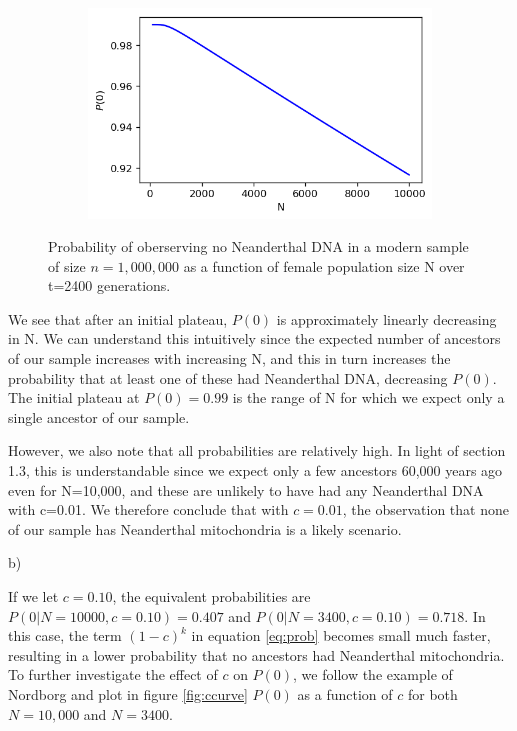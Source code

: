 \documentclass{article}
\begin{document}
\begin{figure}[h]
	\centering
	\begin{subfigure}[t]{0.45\linewidth}
		\centering
		\includegraphics[width = 1.0\linewidth, trim={0 0 0 0}, clip=true]{figures/popN_curve.png}
	\end{subfigure}
\caption{Probability of oberserving no Neanderthal DNA in a modern sample of size $n=1,000,000$ as a function of female population size N over t=2400 generations.}
\label{fig:Ncurve}
\end{figure}

We see that after an initial plateau, $P(0)$ is approximately linearly decreasing in N. We can understand this intuitively since the expected number of ancestors of our sample increases with increasing N, and this in turn increases the probability that at least one of these had Neanderthal DNA, decreasing $P(0)$. The initial plateau at $P(0) = 0.99$ is the range of N for which we expect only a single ancestor of our sample.

However, we also note that all probabilities are relatively high. In light of section 1.3, this is understandable since we expect only a few ancestors 60,000 years ago even for N=10,000, and these are unlikely to have had any Neanderthal DNA with c=0.01. We therefore conclude that with $c=0.01$, the observation that none of our sample has Neanderthal mitochondria is a likely scenario.

b) %

If we let $c = 0.10$, the equivalent probabilities are $P(0|N=10000, c = 0.10) = 0.407$ and $P(0|N=3400, c = 0.10) = 0.718$. In this case, the term $(1-c)^k$  in equation \ref{eq:prob} becomes small much faster, resulting in a lower probability that no ancestors had Neanderthal mitochondria. To further investigate the effect of $c$ on $P(0)$, we follow the example of Nordborg and plot in figure \ref{fig:ccurve} $P(0)$ as a function of $c$ for both $N=10,000$ and $N=3400$.
\end{document}
